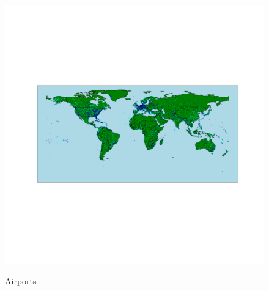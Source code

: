 \medskip\\
\begin{figure}[H]
  \centering
  \caption{Airports}
    \includegraphics[width=1. \textwidth]{Exam/Airports_WorldMap}
  \label{fig:airports}
\end{figure}
